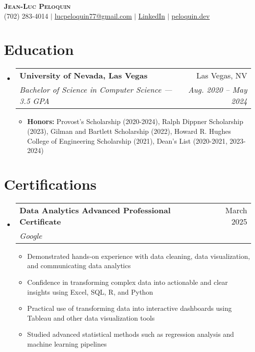 \documentclass[letterpaper,11pt]{article}
\makeatletter
\newcommand{\resumeItem}[1]{
  \item\small{
    {#1 \vspace{-2pt}}
  }
}
\newcommand{\resumeSubheading}[4]{
  \vspace{-2pt}\item
    \begin{tabular*}{0.97\textwidth}[t]{l@{\extracolsep{\fill}}r}
      \textbf{#1} & #2 \\
      \textit{\small#3} & \textit{\small #4} \\
    \end{tabular*}\vspace{-7pt}
}
\newcommand{\resumeSubHeadingListStart}{\begin{itemize}[leftmargin=0.15in, label={}]}
\newcommand{\resumeSubHeadingListEnd}{\end{itemize}}
\newcommand{\resumeItemListStart}{\begin{itemize}}
\newcommand{\resumeItemListEnd}{\end{itemize}\vspace{-5pt}}
\makeatother
\begin{document}

\begin{center}
    \textbf{\Huge \scshape Jean-Luc Peloquin} \\ \vspace{1pt}
    \small (702) 283-4014 $|$ \href{mailto:lucpeloquin77@gmail.com}{lucpeloquin77@gmail.com} $|$ 
    \href{https://www.linkedin.com/in/jean-luc-peloquin/}{LinkedIn} $|$
    \href{https://peloquin.dev/}{peloquin.dev}
\end{center}


\section{Education}
  \resumeSubHeadingListStart
    \resumeSubheading
      {University of Nevada, Las Vegas}{Las Vegas, NV}
      {Bachelor of Science in Computer Science — 3.5 GPA}{Aug. 2020 -- May 2024}
      \resumeItemListStart
        \resumeItem{\textbf{Honors:} Provost's Scholarship (2020-2024), Ralph Dippner Scholarship (2023), Gilman and Bartlett Scholarship (2022), Howard R. Hughes College of Engineering Scholarship (2021), Dean's List (2020-2021, 2023-2024)}
      \resumeItemListEnd
  \resumeSubHeadingListEnd
  
\section{Certifications}
  \resumeSubHeadingListStart
    \resumeSubheading
      {Data Analytics Advanced Professional Certificate}{March 2025}
      {Google}{}
      \resumeItemListStart
        \resumeItem{Demonstrated hands-on experience with data cleaning, data visualization, and communicating data analytics}
        \resumeItem{Confidence in transforming complex data into actionable and clear insights using Excel, SQL, R, and Python}
        \resumeItem{Practical use of transforming data into interactive dashboards using Tableau and other data visualization tools}
        \resumeItem{Studied advanced statistical methods such as regression analysis and machine learning pipelines}
      \resumeItemListEnd
  \resumeSubHeadingListEnd
  
\end{document}
